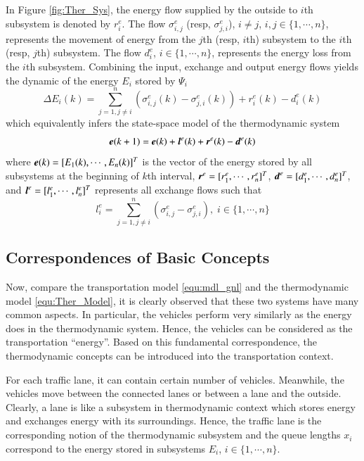 \documentclass[preprint,authoryear,12pt]{elsarticle}
\renewcommand{\vec}[1]{\mbox{\boldmath$#1$}}
\begin{document}
In Figure \ref{fig:Ther_Sys}, the energy flow supplied by the outside
to $i$th subsystem is denoted by $r^e_i$. The flow $\sigma^e_{i,j}$
(resp, $\sigma^e_{j,i}$), $i\neq j$, $i,j\in \{1,\cdots,n\}$,
represents the movement of energy from the $j$th (resp, $i$th)
subsystem to the $i$th (resp, $j$th) subsystem. The flow $d^e_i$,
$i\in \{1,\cdots,n\}$, represents the energy loss from the $i$th
subsystem. Combining the input, exchange and output energy flows
yields the dynamic of the energy $E_i$ stored by $\Psi_i$
\begin{equation}\label{equ:Ther_Model_SubSystem}
\Delta E_i(k) = \sum_{j=1,j\neq
i}^{n}(\sigma^e_{i,j}(k)-\sigma^e_{j,i}(k))+r^e_i(k)-d^e_i(k)
\end{equation}
which equivalently infers the state-space model of the thermodynamic
system
\begin{equation}\label{equ:Ther_Model}
    \vec{e}(k+1)=\vec{e}(k)+\vec{l}^e(k)+\vec{r}^e(k)-\vec{d}^e(k)
\end{equation}
where $\vec{e}(k)=[E_1(k),\cdots,E_n(k)]^T$ is the vector of the
energy stored by all subsystems at the beginning of $k$th interval,
$\vec{r}^e=[r^e_1,\cdots,r^e_n]^T$,
$\vec{d}^e=[d^e_{1},\cdots,d^e_{n}]^T$, and
$\vec{l}^e=[l^e_1,\cdots,l^e_n]^T$ represents all exchange flows such
that
\begin{equation*}
l^e_i = \sum_{j=1,j\neq i}^{n}
        (\sigma^e_{i,j}-\sigma^e_{j,i}),
\; i\in \{1,\cdots,n\}
\end{equation*}

\subsection{Correspondences of Basic Concepts}

Now, compare the transportation model \eqref{equ:mdl_gnl} and the
thermodynamic model \eqref{equ:Ther_Model}, it is clearly observed
that these two systems have many common aspects. In particular, the
vehicles perform very similarly as the energy does in the
thermodynamic system. Hence, the vehicles can be considered as the
transportation ``energy''. Based on this fundamental correspondence,
the thermodynamic concepts can be introduced into the transportation
context.

For each traffic lane, it can contain certain number of vehicles.
Meanwhile, the vehicles move between the connected lanes or between a
lane and the outside. Clearly, a lane is like a subsystem in
thermodynamic context which stores energy and exchanges energy with
its surroundings. Hence, the traffic lane is the corresponding notion
of the thermodynamic subsystem and the queue lengths $x_i$ correspond
to the energy stored in subsystems $E_i$, $i\in\{1,\cdots,n\}$.
\end{document}
